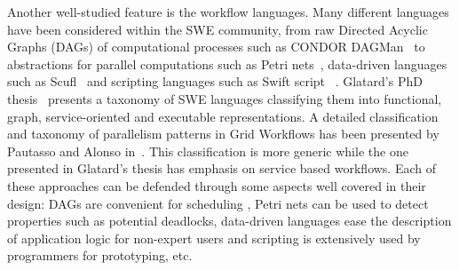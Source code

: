 Another well-studied feature is the workflow languages. Many different
languages have been considered within the SWE community, from raw Directed
Acyclic Graphs (DAGs) of computational processes such as CONDOR
DAGMan~\cite{dagman} to abstractions for parallel computations such as Petri
nets~\cite{alt-hoheisel:2005}, data-driven languages such as
Scufl~\cite{turi-missier-etal:2007} and scripting languages such as Swift
script~ \cite{swift}. Glatard's PhD thesis~\cite{glatard:2007} presents a
taxonomy of SWE languages classifying them into functional, graph,
service-oriented and executable representations. A detailed classification and
taxonomy of parallelism patterns in Grid Workflows has been presented by
Pautasso and Alonso in~\cite{pautasso1}. This classification is more generic
while the one presented in Glatard's thesis has emphasis on service based
workflows.  Each of these approaches can be defended through some aspects well
covered in their design: DAGs are convenient for scheduling
\cite{Malewicz:2007,hall-rosenberg-etal:2007}, Petri nets can be used to detect
properties such as potential deadlocks, data-driven languages ease the
description of application logic for non-expert users and scripting is
extensively used by programmers for prototyping, etc.
